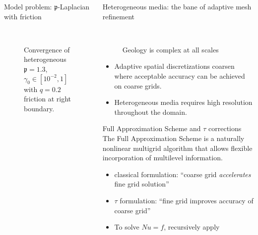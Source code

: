 \documentclass[final,t]{beamer}
\newcommand\pfrak{{\mathfrak p}}
\begin{document}
\begin{frame}{}
\begin{columns}
\begin{column}{0.31\textwidth}
\begin{block}{Model problem: $\mathfrak p$-Laplacian with friction}
        \begin{figure}
          \centering
           ~
           ~
          \caption{Convergence of heterogeneous $\pfrak = 1.3$, $\gamma_0 \in [10^{-2},1]$ with $q = 0.2$ friction at right boundary.}
          \label{fig:plaplace-friction}
        \end{figure}
      \end{block}
    \end{column}
    \begin{column}{0.31\textwidth}
      \begin{block}{Heterogeneous media: the bane of adaptive mesh refinement}
        \begin{figure}
          \centering
           ~
          \caption{Geology is complex at all scales}
          \label{fig:moffit}
        \end{figure}
        \begin{itemize}
        \item Adaptive spatial discretizations coarsen where acceptable accuracy can be achieved on coarse grids.
        \item Heterogeneous media requires high resolution throughout the domain.
        \end{itemize}
      \end{block}
      \vspace{-2em}
      \begin{block}{Full Approximation Scheme and $\tau$ corrections}
        The Full Approximation Scheme is a naturally nonlinear multigrid algorithm that allows flexible incorporation of multilevel information.
        \begin{itemize}
        \item classical formulation: ``coarse grid \emph{accelerates} fine grid solution''
        \item $\tau$ formulation: ``fine grid improves accuracy of coarse grid''
        \item To solve $N u = f$, recursively apply

\end{itemize}
\end{block}
\end{column}
\end{columns}
\end{frame}
\end{document}

